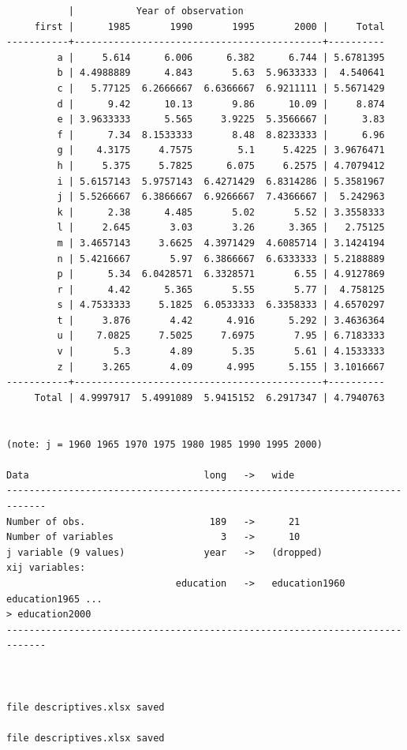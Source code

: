 \documentclass[
  12pt,
]{article}
\begin{document}
\begin{verbatim}
           |           Year of observation
     first |      1985       1990       1995       2000 |     Total
-----------+--------------------------------------------+----------
         a |     5.614      6.006      6.382      6.744 | 5.6781395
         b | 4.4988889      4.843       5.63  5.9633333 |  4.540641
         c |   5.77125  6.2666667  6.6366667  6.9211111 | 5.5671429
         d |      9.42      10.13       9.86      10.09 |     8.874
         e | 3.9633333      5.565     3.9225  5.3566667 |      3.83
         f |      7.34  8.1533333       8.48  8.8233333 |      6.96
         g |    4.3175     4.7575        5.1     5.4225 | 3.9676471
         h |     5.375     5.7825      6.075     6.2575 | 4.7079412
         i | 5.6157143  5.9757143  6.4271429  6.8314286 | 5.3581967
         j | 5.5266667  6.3866667  6.9266667  7.4366667 |  5.242963
         k |      2.38      4.485       5.02       5.52 | 3.3558333
         l |     2.645       3.03       3.26      3.365 |   2.75125
         m | 3.4657143     3.6625  4.3971429  4.6085714 | 3.1424194
         n | 5.4216667       5.97  6.3866667  6.6333333 | 5.2188889
         p |      5.34  6.0428571  6.3328571       6.55 | 4.9127869
         r |      4.42      5.365       5.55       5.77 |  4.758125
         s | 4.7533333     5.1825  6.0533333  6.3358333 | 4.6570297
         t |     3.876       4.42      4.916      5.292 | 3.4636364
         u |    7.0825     7.5025     7.6975       7.95 | 6.7183333
         v |       5.3       4.89       5.35       5.61 | 4.1533333
         z |     3.265       4.09      4.995      5.155 | 3.1016667
-----------+--------------------------------------------+----------
     Total | 4.9997917  5.4991089  5.9415152  6.2917347 | 4.7940763


(note: j = 1960 1965 1970 1975 1980 1985 1990 1995 2000)

Data                               long   ->   wide
-----------------------------------------------------------------------------
Number of obs.                      189   ->      21
Number of variables                   3   ->      10
j variable (9 values)              year   ->   (dropped)
xij variables:
                              education   ->   education1960 education1965 ... 
> education2000
-----------------------------------------------------------------------------



file descriptives.xlsx saved

file descriptives.xlsx saved
\end{verbatim}
\end{document}
